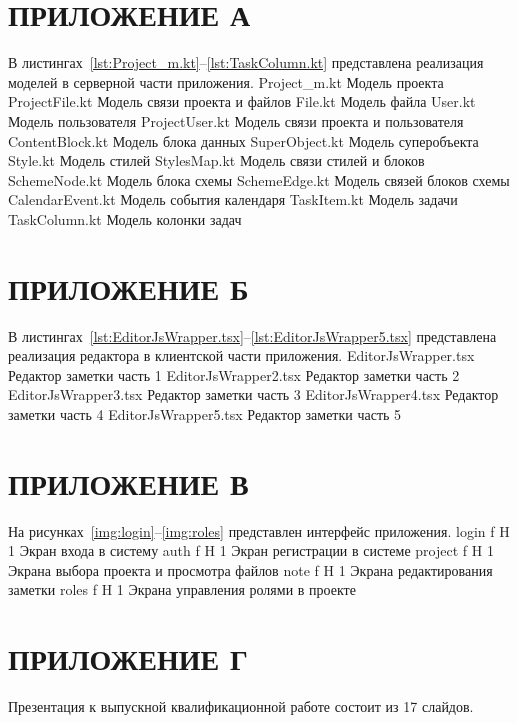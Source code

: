 \chapter*{ПРИЛОЖЕНИЕ А}
	\renewcommand{\thelstlisting}{А.\arabic{lstlisting}}
	\setcounter{lstlisting}{0}
	В листингах~\ref{lst:Project_m.kt}--\ref{lst:TaskColumn.kt} представлена реализация моделей в серверной части приложения. 
		{Project_m.kt}
		{Модель проекта}
		{ProjectFile.kt}
		{Модель связи проекта и файлов}
	\clearpage
		{File.kt}
		{Модель файла}
	\clearpage
		{User.kt}
		{Модель пользователя}
	\clearpage
		{ProjectUser.kt}
		{Модель связи проекта и пользователя}
		{ContentBlock.kt}
		{Модель блока данных}
	\clearpage
		{SuperObject.kt}
		{Модель суперобъекта}
		{Style.kt}
		{Модель стилей}
		{StylesMap.kt}
		{Модель связи стилей и блоков}	
	\clearpage
		{SchemeNode.kt}
		{Модель блока схемы}
		{SchemeEdge.kt}
		{Модель связей блоков схемы}	
		{CalendarEvent.kt}
		{Модель события календаря}
	\clearpage
		{TaskItem.kt}
		{Модель задачи}
		{TaskColumn.kt}
		{Модель колонки задач}	
\chapter*{ПРИЛОЖЕНИЕ Б}
	\renewcommand{\thelstlisting}{Б.\arabic{lstlisting}}
	\setcounter{lstlisting}{0}
	В листингах~\ref{lst:EditorJsWrapper.tsx}--\ref{lst:EditorJsWrapper5.tsx} представлена реализация редактора в клиентской части приложения. 
		{EditorJsWrapper.tsx}
		{Редактор заметки часть 1}
	\clearpage
		{EditorJsWrapper2.tsx}
		{Редактор заметки часть 2}
	\clearpage
		{EditorJsWrapper3.tsx}
		{Редактор заметки часть 3}
	\clearpage
		{EditorJsWrapper4.tsx}
		{Редактор заметки часть 4}
	\clearpage
		{EditorJsWrapper5.tsx}
		{Редактор заметки часть 5}
\chapter*{ПРИЛОЖЕНИЕ В\\}
	\renewcommand{\thefigure}{В.\arabic{figure}}
	\setcounter{figure}{0}
	На рисунках~\ref{img:login}--\ref{img:roles} представлен интерфейс приложения.
		{login}
		{f}
		{H}
		{1\textwidth}
		{Экран входа в систему}
		{auth}
		{f}
		{H}
		{1\textwidth}
		{Экран регистрации в системе}
		{project}
		{f}
		{H}
		{1\textwidth}
		{Экрана выбора проекта и просмотра файлов}
		{note}
		{f}
		{H}
		{1\textwidth}
		{Экрана редактирования заметки}
		{roles}
		{f}
		{H}
		{1\textwidth}
		{Экрана управления ролями в проекте}
\chapter*{ПРИЛОЖЕНИЕ Г}
	\renewcommand{\thelstlisting}{В.\arabic{lstlisting}}
	\setcounter{lstlisting}{0}
	Презентация к выпускной квалификационной работе состоит из 17 слайдов.